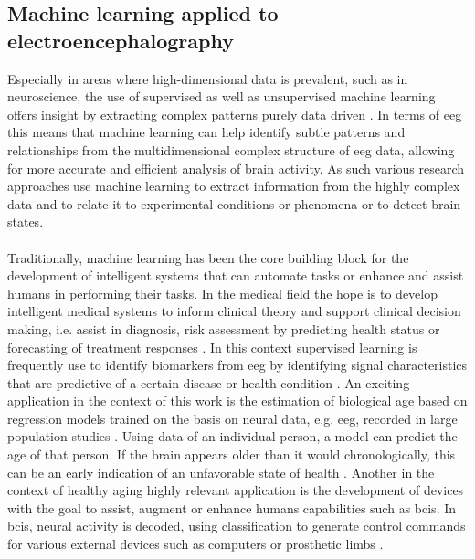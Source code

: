 \subsection{Machine learning applied to electroencephalography}
Especially in areas where high-dimensional data is prevalent, such as in neuroscience, the use of supervised as well as unsupervised machine learning offers insight by extracting complex patterns purely data driven \cite{Bzdok2017}. In terms of \gls{eeg} this means that machine learning can help identify subtle patterns and relationships from the multidimensional complex structure of \gls{eeg} data, allowing for more accurate and efficient analysis of brain activity. As such various research approaches use machine learning to extract information from the highly complex data and to relate it to experimental conditions or phenomena or to detect brain states.\\
\\
Traditionally, machine learning has been the core building block for the development of intelligent systems that can automate tasks or enhance and assist humans in performing their tasks. In the medical field the hope is to develop intelligent medical systems to inform clinical theory and support clinical decision making, i.e. assist in diagnosis, risk assessment by predicting health status or forecasting of treatment responses \cite{Woo2017}. In this context supervised learning is frequently use to identify biomarkers from \gls{eeg} by identifying signal characteristics that are predictive of a certain disease or health condition \cite{Babiloni_AlzCons2021,Mei2021}. An exciting application in the context of this work is the estimation of biological age based on regression models trained on the basis on neural data, e.g. \gls{eeg}, recorded in large population studies \cite{Engemann2022}. Using data of an individual person, a model can predict the age of that person. If the brain appears older than it would chronologically, this can be an early indication of an unfavorable state of health \cite{Gonneaud2021}. Another in the context of healthy aging highly relevant application is the development of devices with the goal to assist, augment or enhance humans capabilities such as \glspl{bci}. In \glspl{bci}, neural activity is decoded, using classification to generate control commands for various external devices such as computers or prosthetic limbs \cite{Saha2021, Anumanchipalli2019}.\\

